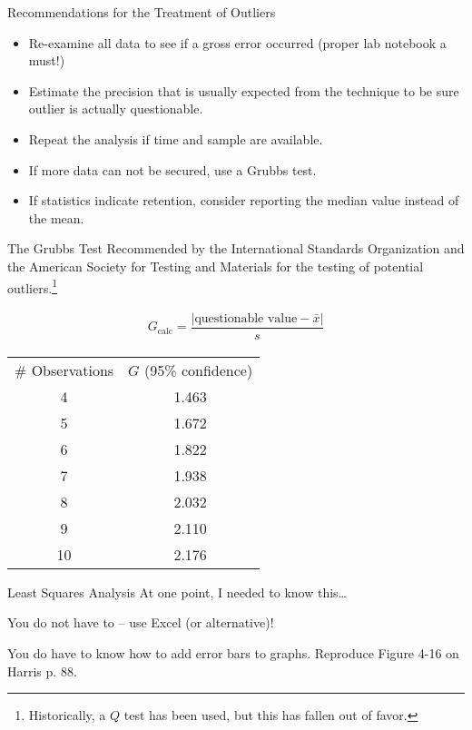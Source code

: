 \documentclass{beamer}
\begin{document}
\begin{frame}{Recommendations for the Treatment of Outliers}
	\begin{itemize}
		\item Re-examine all data to see if a gross error occurred
			(proper lab notebook a must!)
		\item Estimate the precision that is usually expected from the
			technique to be sure outlier is actually questionable.
		\item Repeat the analysis if time and sample are available.
		\item If more data can not be secured, use a Grubbs test.
		\item If statistics indicate retention, consider reporting the
			median value instead of the mean.
	\end{itemize}
\end{frame}

\begin{frame}{The Grubbs Test}
	Recommended by the International Standards Organization and the American
	Society for Testing and Materials for the testing of potential
	outliers.\footnote{Historically, a $Q$ test has been used, but this has
	fallen out of favor.}

	\begin{align*}
		G_{\text{calc}} = \dfrac{|\text{questionable value} -
		\bar{x}|}{s}
	\end{align*}

	\begin{center}
	\begin{tabu} to \textwidth {c S[table-format=1.3]}
		\# Observations & {$G$ (95\% confidence)} \\
		\tabucline[1.5pt]{-}
		4 & 1.463 \\
		5 & 1.672 \\
		6 & 1.822 \\
		7 & 1.938 \\
		8 & 2.032 \\
		9 & 2.110 \\
		10 & 2.176
	\end{tabu}
	\end{center}
\end{frame}

\begin{frame}{Least Squares Analysis}
	At one point, I needed to know this\ldots

	\vspace{1em}

	You do not have to -- use Excel (or alternative)!

	\vspace{1em}

	You \alert{do} have to know how to add error bars to graphs. Reproduce
	Figure 4-16 on Harris p. 88.
\end{frame}
 
\end{document}
